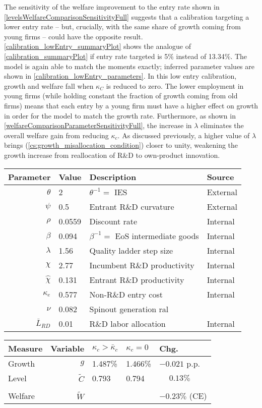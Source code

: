 \documentclass[ecta,nameyear,final]{econsocart}
\theoremstyle{definition}
\begin{document}
The sensitivity of the welfare improvement to the entry rate shown in \autoref{levelsWelfareComparisonSensitivityFull} suggests that a calibration targeting a lower entry rate -- but, crucially, with the same share of growth coming from young firms -- could have the opposite result. \autoref{calibration_lowEntry_summaryPlot} shows the analogue of \autoref{calibration_summaryPlot} if entry rate targeted is 5\% instead of 13.34\%. The model is again able to match the moments exactly; inferred parameter values are shown in \autoref{calibration_lowEntry_parameters}. In this low entry calibration, growth and welfare fall when $\kappa_C$ is reduced to zero. The lower employment in young firms (while holding constant the fraction of growth coming from old firms) means that each entry by a young firm must have a higher effect on growth in order for the model to match the growth rate. Furthermore, as shown in \autoref{welfareComparisonParameterSensitivityFull}, the increase in $\lambda$ eliminates the overall welfare gain from reducing $\kappa_c$. As discussed previously, a higher value of $\lambda$ brings (\ref{cs:growth_misallocation_condition}) closer to unity, weakening the growth increase from reallocation of R\&D to own-product innovation.

\begin{table}[]
	\centering
	\label{calibration_lowEntry_parameters}
	\begin{tabular}{rlll}
		\toprule \toprule
		Parameter & Value & Description & Source \tabularnewline
		\midrule
		$\theta$ & 2 & $\theta^{-1} = $ IES & External 
		\tabularnewline
		$\psi$ & 0.5 & Entrant R\&D curvature & External \tabularnewline
		$\rho$ & 0.0559 & Discount rate  & Internal \tabularnewline
		$\beta$ & 0.094 & $\beta^{-1} = $ EoS intermediate goods & Internal \tabularnewline 
		$\lambda$ & 1.56 & Quality ladder step size & Internal 
		\tabularnewline
		$\chi$ & 2.77 & Incumbent R\&D productivity & Internal 
		\tabularnewline
		$\hat{\chi}$ & 0.131 & Entrant R\&D productivity & Internal \tabularnewline 
		$\kappa_e$ & 0.577 & Non-R\&D entry cost & Internal \tabularnewline
		$\nu$ & 0.082 & Spinout generation ral\tabularnewline
		$\bar{L}_{RD}$ & 0.01 & R\&D labor allocation  & Internal \tabularnewline
		\bottomrule
	\end{tabular}
\end{table}

\begin{table}
	\centering
	\label{reducing_kappa_c_table_lowEntry}
	\begin{tabular}{lrlll}
		\toprule \toprule
		Measure & Variable & $\kappa_c > \bar{\kappa}_c$ & $\kappa_c = 0$ & Chg. \tabularnewline
		\midrule
		Growth & $g$ & 1.487\% & 1.466\% & $-0.021$ p.p. \tabularnewline
		Level & $\tilde{C}$  & 0.793 &  0.794 & $\phantom{-}0.13\%$ \tabularnewline 
		\tabularnewline
		Welfare & $\tilde{W}$  &  & & $-0.23\%$ (CE)  \tabularnewline
		\bottomrule
	\end{tabular}
\end{table}
\end{document}
